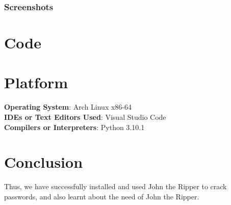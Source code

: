 \documentclass[11pt]{article}
\begin{document}
\subsubsection{Screenshots}


\section{Code}



\section{Platform}
\textbf{Operating System}: Arch Linux x86-64 \\
\textbf{IDEs or Text Editors Used}: Visual Studio Code\\
\textbf{Compilers or Interpreters}: Python 3.10.1\\

\section{Conclusion}
Thus, we have successfully installed and used John the Ripper to crack
passwords, and also learnt about the need of John the Ripper.

\clearpage
\end{document}
